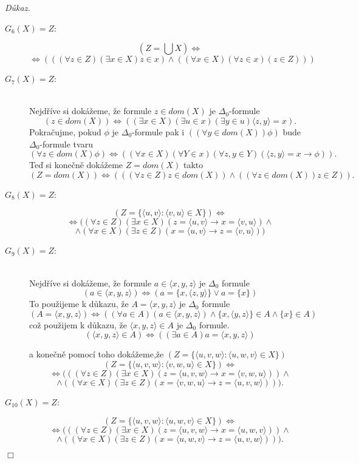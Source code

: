 \documentclass[12pt,a4paper]{article}
\newenvironment{proof}
{\noindent \textit{D\r{u}kaz.}}
{\hspace*{\fill} $\Box$}
\begin{document}
\begin{proof}
\begin{description}
\item[$ G_6(X)= Z $:] 
\[  (Z=\bigcup X ) \Leftrightarrow\] \[\Leftrightarrow (((\forall z \in Z)(\exists x \in X) z \in x) \wedge ((\forall x \in X) (\forall z \in x)(z \in Z)))  \] 
\item[$ G_7(X)= Z $:]
~\\
Nejd\v{r}\'{i}ve si dok\'{a}\v{z}eme, \v{z}e formule $  z \in dom(X) $ je  $\Delta_0$-formule
\[ (z \in dom(X)) \Leftrightarrow ((\exists x \in X)(\exists u \in x)(\exists y \in u)\langle z ,y \rangle  = x) .\]
Pokra\v{c}ujme, pokud $  \phi $ je  $\Delta_0$-formule pak  i $ ((\forall y \in dom(X))\phi) $ bude $\Delta_0$-formule tvaru
\[ (\forall z \in dom(X)\phi) \Leftrightarrow  ((\forall x \in X)(\forall Y \in x)(\forall z,y \in Y)(\langle z,y  \rangle  = x \rightarrow \phi  )) . \]
Te\v{d} si kone\v{c}n\v{e} dok\'{a}\v{z}eme $ Z=dom(X) $ takto
 \[  (Z=dom(X) ) \Leftrightarrow (((\forall z \in Z) z \in dom(X))\wedge ((\forall z \in dom(X)) z\in Z)).\]
\item[$ G_8(X)= Z $:] 
\[(Z = \{\langle u,v \rangle: \langle v,u \rangle \in X \} )  \Leftrightarrow \] \[ \Leftrightarrow ((\forall z \in Z) (\exists x \in X)(z=\langle u,v \rangle \rightarrow x=\langle v,u \rangle) \wedge\] \[ \wedge(\forall x \in X) (\exists z \in Z)(x=\langle u,v \rangle \rightarrow z=\langle v,u \rangle)) \]
 \item[ $ G_9(X)= Z $:]
 ~\\
Nejd\v{r}\'{i}ve si dok\'{a}\v{z}eme, \v{z}e formule $ a \in  \langle x,y,z \rangle $ je  $\Delta_0$ formule \\
\[  (a \in  \langle x,y,z \rangle )\Leftrightarrow (a=\{x,\langle z,y \rangle\} \vee a= \{x\})  \] 
To pou\v{z}ijeme k d\r{u}kazu, \v{z}e $ A=\langle x,y,z \rangle   $ je  $\Delta_0$ formule
\[ (A=\langle x,y,z \rangle ) \Leftrightarrow ((\forall a \in A)  (a \in  \langle x,y,z \rangle ) \wedge \{x,\langle y,z \rangle\} \in A \wedge \{x\} \in A)\]
co\v{z} pou\v{z}ijem k d\r{u}kazu, \v{z}e $ \langle x,y,z \rangle \in A $ je  $\Delta_0$ formule.
\[ (\langle x,y,z \rangle \in A)  \Leftrightarrow ((\exists a \in A) a= \langle x,y,z \rangle ) \]

a kone\v{c}n\v{e} pomoc\'{i} toho dok\'{a}\v{z}eme,\v{z}e  $  (Z = \{\langle u,v,w \rangle: \langle u,w,v \rangle \in X \} )$ \\
 \[ (Z = \{\langle u,v,w \rangle: \langle v,w,u \rangle \in X \} ) \Leftrightarrow  \]  \[  \Leftrightarrow  (((\forall z \in Z)(\exists x \in X)(z=\langle u,v,w \rangle \rightarrow x= \langle v,w,u \rangle)) \wedge  \] \[ \wedge  ((\forall x \in X)(\exists z \in Z)( x= \langle v,w,u \rangle \rightarrow z=\langle u,v,w \rangle))). \] 
\item[$ G_{10}(X)= Z $:] 
 \[ (Z = \{\langle u,v,w \rangle: \langle u,w,v \rangle \in X \} ) \Leftrightarrow  \]  \[  \Leftrightarrow  (((\forall z \in Z)(\exists x \in X)(z=\langle u,v,w \rangle \rightarrow x= \langle u,w,v \rangle)) \wedge  \] \[ \wedge  ((\forall x \in X)(\exists z \in Z)( x= \langle u,w,v \rangle \rightarrow z=\langle u,v,w \rangle))) .\] 
\end{description}
\end{proof}
\end{document}
